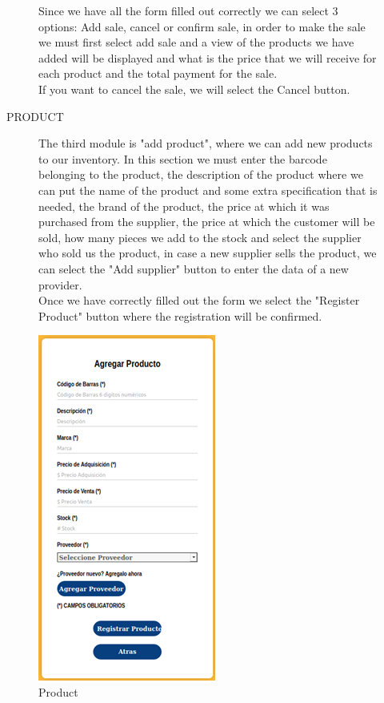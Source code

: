 \documentclass{article}
\begin{document}
\begin{figure}[ht]
\begin{minipage}[t]{0.5\linewidth}
Since we have all the form filled out correctly we can select 3 options: Add sale, cancel or confirm sale, in order to make the sale we must first select add sale and a view of the products we have added will be displayed and what is the price that we will receive for each product and the total payment for the sale.\\

If you want to cancel the sale, we will select the Cancel button.
\end{minipage}
\end{figure}

\pagebreak

\begin{center}
PRODUCT
\end{center}
\begin{figure}[ht]
\begin{minipage}[t]{0.5\linewidth}
\bigskip
\bigskip
\bigskip
\bigskip
The third module is "add product", where we can add new products to our inventory. In this section we must enter the barcode belonging to the product, the description of the product where we can put the name of the product and some extra specification that is needed, the brand of the product, the price at which it was purchased from the supplier, the price at which the customer will be sold, how many pieces we add to the stock and select the supplier who sold us the product, in case a new supplier sells the product, we can select the "Add supplier" button to enter the data of a new provider.\\

Once we have correctly filled out the form we select the "Register Product" button where the registration will be confirmed.\\
\end{minipage}
\begin{minipage}[t]{0.5\linewidth}
\caption {Product}
\centering
\includegraphics[scale=1]{fig7}
\end{minipage}
\end{figure}
\end{document}
